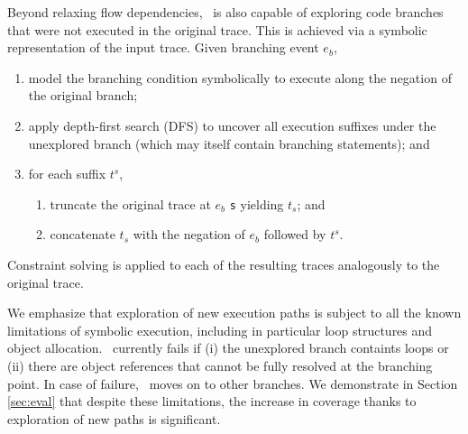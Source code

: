 Beyond relaxing flow dependencies, \tool\ is also capable of exploring code branches that were not executed in the original trace. This is achieved via a symbolic representation of the input trace. Given branching event $e_b$,
\begin{enumerate}
	\item model the branching condition symbolically to execute along the negation of the original branch;
	\item apply depth-first search (DFS) to uncover all execution suffixes under the unexplored branch (which may itself contain branching statements); and
	\item for each suffix $t^s$,
	\begin{enumerate}
		\item truncate the original trace at $e_b$ {\tt s} yielding $t_s$; and
		\item concatenate $t_s$ with the negation of $e_b$ followed by $t^s$.
	\end{enumerate}
\end{enumerate}
Constraint solving is applied to each of the resulting traces analogously to the original trace.

We emphasize that exploration of new execution paths is subject to all the known limitations of symbolic execution, including in particular loop structures and object allocation. \tool\ currently fails if (i) the unexplored branch containts loops or (ii) there are object references that cannot be fully resolved at the branching point. In case of failure, \tool\ moves on to other branches. We demonstrate in Section \ref{sec:eval} that despite these limitations, the increase in coverage thanks to exploration of new paths is significant.